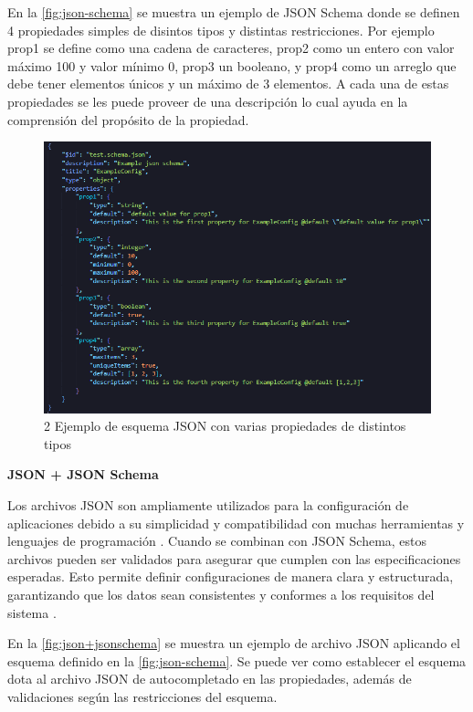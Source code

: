 En la \autoref{fig:json-schema} se muestra un ejemplo de JSON Schema donde se definen 4 propiedades simples de disintos tipos y distintas restricciones. Por ejemplo prop1 se define como una cadena de caracteres, prop2 como un entero con valor máximo 100 y valor mínimo 0, prop3 un booleano, y prop4 como un arreglo que debe tener elementos únicos y un máximo de 3 elementos. A cada una de estas propiedades se les puede proveer de una descripción lo cual ayuda en la comprensión del propósito de la propiedad.

\begin{figure}[H]
    \centering
    \includegraphics[width=\linewidth]{images/json-schema.png}
    \caption{2 Ejemplo de esquema JSON con varias propiedades de distintos tipos}
    \label{fig:json-schema}
\end{figure}

\textbf{JSON + JSON Schema}

Los archivos JSON son ampliamente utilizados para la configuración de aplicaciones debido a su simplicidad y compatibilidad con muchas herramientas y lenguajes de programación \autocite{erickson_what_2024}. Cuando se combinan con JSON Schema, estos archivos pueden ser validados para asegurar que cumplen con las especificaciones esperadas. Esto permite definir configuraciones de manera clara y estructurada, garantizando que los datos sean consistentes y conformes a los requisitos del sistema \autocite{bray_javascript_2014,attouche_witness_2022}.

En la \autoref{fig:json+jsonschema} se muestra un ejemplo de archivo JSON aplicando el esquema definido en la \autoref{fig:json-schema}. Se puede ver como establecer el esquema dota al archivo JSON de autocompletado en las propiedades, además de validaciones según las restricciones del esquema.

